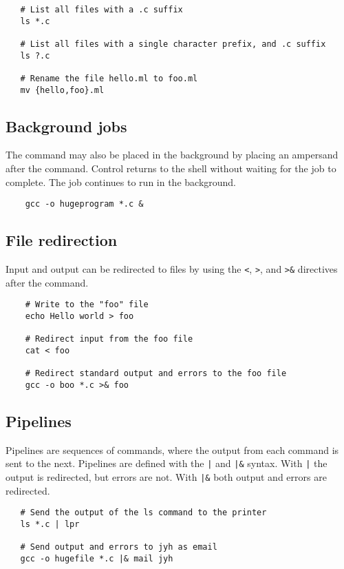 \begin{verbatim}
   # List all files with a .c suffix
   ls *.c

   # List all files with a single character prefix, and .c suffix
   ls ?.c

   # Rename the file hello.ml to foo.ml
   mv {hello,foo}.ml
\end{verbatim}

\subsection{Background jobs}

The command may also be placed in the background by placing an ampersand after the command.  Control
returns to the shell without waiting for the job to complete.  The job continues to run in the
background.

\begin{verbatim}
    gcc -o hugeprogram *.c &
\end{verbatim}

\subsection{File redirection}

Input and output can be redirected to files by using the \verb+<+, \verb+>+, and \verb+>&+
directives after the command.

\begin{verbatim}
    # Write to the "foo" file
    echo Hello world > foo

    # Redirect input from the foo file
    cat < foo

    # Redirect standard output and errors to the foo file
    gcc -o boo *.c >& foo
\end{verbatim}

\subsection{Pipelines}

Pipelines are sequences of commands, where the output from each command is sent to the next.
Pipelines are defined with the \verb+|+ and \verb+|&+ syntax.  With \verb+|+ the output is
redirected, but errors are not.  With \verb+|&+ both output and errors are redirected.

\begin{verbatim}
   # Send the output of the ls command to the printer
   ls *.c | lpr

   # Send output and errors to jyh as email
   gcc -o hugefile *.c |& mail jyh
\end{verbatim}

